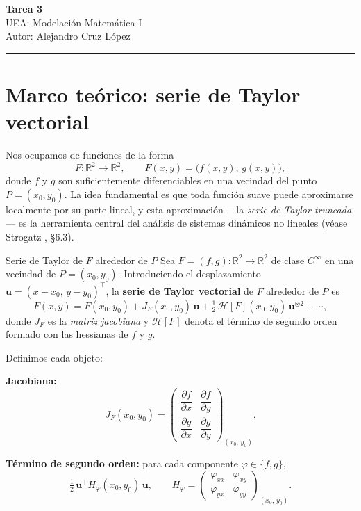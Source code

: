 \documentclass[11pt,letterpaper]{article}
\begin{document}
\begin{center}
  {\LARGE\bfseries Tarea 3}\\[6pt]
  {\large UEA: Modelación Matemática I}\\[4pt]
  {\large Autor: Alejandro Cruz López}
\end{center}

\bigskip
\noindent\rule{\textwidth}{0.5pt}
\bigskip

\section{Marco teórico: serie de Taylor vectorial}

Nos ocupamos de funciones de la forma
\[
  F:\mathbb{R}^2\longrightarrow\mathbb{R}^2,
  \qquad
  F(x,y)=\bigl(f(x,y),\,g(x,y)\bigr),
\]
donde $f$ y $g$ son suficientemente diferenciables en una vecindad del punto
$P=(x_0,y_0)$.
La idea fundamental es que toda función suave puede aproximarse localmente
por su parte lineal, y esta aproximación —la \emph{serie de Taylor truncada}—
es la herramienta central del análisis de sistemas dinámicos no lineales
(véase Strogatz \cite{strogatz2018}, \S6.3).

\begin{definicion}{Serie de Taylor de $F$ alrededor de $P$}{}
Sea $F=(f,g):\mathbb{R}^2\to\mathbb{R}^2$ de clase $C^\infty$ en una vecindad
de $P=(x_0,y_0)$. Introduciendo el desplazamiento
$\mathbf{u}=(x-x_0,\,y-y_0)^{\!\top}$, la \textbf{serie de Taylor vectorial}
de $F$ alrededor de $P$ es
\[
  F(x,y)
  = F(x_0,y_0)
  + J_F(x_0,y_0)\,\mathbf{u}
  + \tfrac{1}{2}\,\mathcal{H}[F](x_0,y_0)\,\mathbf{u}^{\otimes 2}
  + \cdots,
\]
donde $J_F$ es la \emph{matriz jacobiana} y $\mathcal{H}[F]$ denota el término
de segundo orden formado con las hessianas de $f$ y $g$.
\end{definicion}

Definimos cada objeto:

\textbf{Jacobiana:}
\[
  J_F(x_0,y_0)
  = \begin{pmatrix}
      \dfrac{\partial f}{\partial x} & \dfrac{\partial f}{\partial y}\\[8pt]
      \dfrac{\partial g}{\partial x} & \dfrac{\partial g}{\partial y}
    \end{pmatrix}_{\!(x_0,\,y_0)}.
\]

\textbf{Término de segundo orden:} para cada componente $\varphi\in\{f,g\}$,
\[
  \tfrac{1}{2}\,\mathbf{u}^{\top} H_\varphi(x_0,y_0)\,\mathbf{u},
  \qquad
  H_\varphi = \begin{pmatrix}
    \varphi_{xx} & \varphi_{xy}\\
    \varphi_{yx} & \varphi_{yy}
  \end{pmatrix}_{\!(x_0,\,y_0)}.
\]
\end{document}
